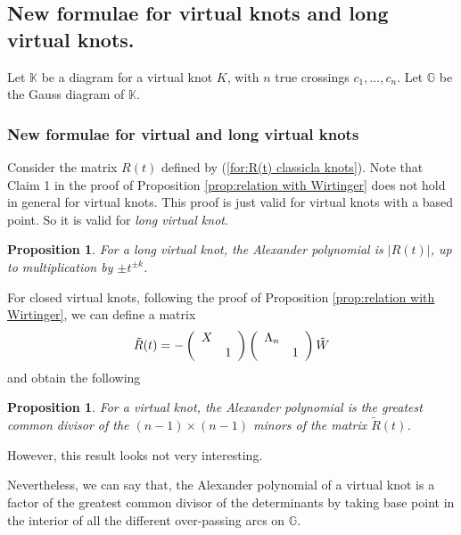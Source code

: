 \documentclass{amsart}
\newtheorem{prop}[thm]{Proposition}
\theoremstyle{definition}
\theoremstyle{remark}
\numberwithin{equation}{subsection}
\begin{document}
\subsection{New formulae for virtual knots and long virtual knots.}

Let $\mathbb{K}$ be a diagram for a virtual knot $K$, with $n$ true crossings $c_{1},...,c_{n}$. Let $\mathbb{G}$ be the Gauss diagram of $\mathbb{K}$.

\subsubsection{New formulae for virtual and  long virtual knots }
Consider the matrix $R(t)$ defined by (\ref{for:R(t) classicla knots}). Note that Claim 1 in the proof of Proposition \ref{prop:relation with  Wirtinger} does not hold in general for virtual knots. This proof is just valid for virtual knots with a based point. So it is valid for \emph{long virtual knot}\cite{GoussarovPolyakViro2000}.
\begin{prop}
    For a long virtual knot, the Alexander polynomial is $ |R(t)|$, up to multiplication by $\pm t^{\pm k}$.
\end{prop}

For closed virtual knots, following the proof of Proposition \ref{prop:relation with  Wirtinger}, we can define a matrix
\begin{align}
 \tilde{R}(t) = - \left( 
 \begin{array}[]{cc}  
 X &    \\
   & 1
 \end{array}\right)
 \left( 
 \begin{array}[]{cc}  
 \Lambda_{n} &    \\
   & 1
 \end{array}\right)
\tilde{W} \nonumber
\end{align}
and obtain the following
\begin{prop}
    For a virtual knot, the Alexander polynomial is the greatest common divisor of the $(n - 1) \times (n - 1)$ minors of the matrix $\tilde{R}(t)$.
\end{prop}
However, this result looks not very interesting.

Nevertheless, we can say that, the Alexander polynomial of a virtual knot is a factor of the greatest common divisor of the determinants by taking base point in the interior of all the different over-passing arcs on $\mathbb{G}$.
\end{document}
